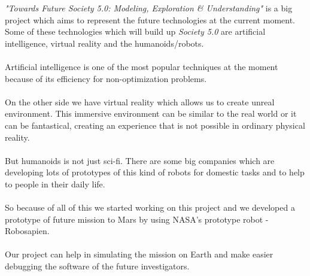 \documentclass[documentation.tex]{subfiles}
\begin{document}
	\textit{"Towards Future Society 5.0: Modeling, Exploration \& Understanding"} is a big project which aims to represent the future technologies at the current moment. Some of these technologies which will build up \textit{Society 5.0} are artificial intelligence, virtual reality and the humanoids/robots. \\ \\
	Artificial intelligence is one of the most popular techniques at the moment because of its efficiency for non-optimization problems. \\ \\
	On the other side we have virtual reality which allows us to create unreal environment. This immersive environment can be similar to the real world or it can be fantastical, creating an experience that is not possible in ordinary physical reality. \\ \\
	But humanoids is not just sci-fi. There are some big companies which are developing lots of prototypes of this kind of robots for domestic tasks and to help to people in their daily life. \\ \\ 
	So because of all of this we started working on this project and we developed a prototype of future mission to Mars by using NASA's prototype robot - Robosapien. \\ \\
	Our project can help in simulating the mission on Earth and make easier debugging the software of the future investigators.  
\end{document}
